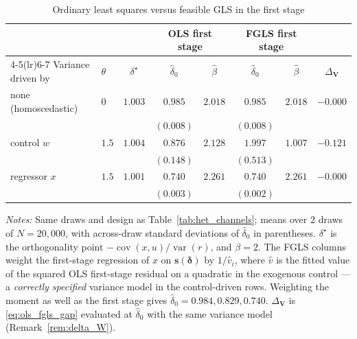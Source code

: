 \begin{table}[!h]
\centering
\caption{Ordinary least squares versus feasible GLS in the first stage}
\label{tab:fgls}
\begin{threeparttable}
\begin{tabular}{llcccccc}
\toprule
& & & \multicolumn{2}{c}{OLS first stage}
& \multicolumn{2}{c}{FGLS first stage} & \\
\cmidrule(lr){4-5}\cmidrule(lr){6-7}
Variance driven by & \(\theta\) & \(\delta^\star\)
& \(\widehat\delta_0\) & \(\widehat\beta\)
& \(\widehat\delta_0\) & \(\widehat\beta\)
& \(\Delta_{\mathbf V}\) \\
\midrule
none (homoscedastic) & \(0\) & \(1.003\) & \(0.985\) & \(2.018\) & \(0.985\) & \(2.018\) & \(-0.000\) \\
 & & & \((0.008)\) & & \((0.008)\) & & \\
\midrule
control \(w\) & \(1.5\) & \(1.004\) & \(0.876\) & \(2.128\) & \(1.997\) & \(1.007\) & \(-0.121\) \\
 & & & \((0.148)\) & & \((0.513)\) & & \\
\midrule
regressor \(x\) & \(1.5\) & \(1.001\) & \(0.740\) & \(2.261\) & \(0.740\) & \(2.261\) & \(-0.000\) \\
 & & & \((0.003)\) & & \((0.002)\) & & \\
\bottomrule
\end{tabular}
\begin{tablenotes}
\small
\item \textit{Notes:} Same draws and design as Table~\ref{tab:het_channels};
means over \(2\) draws of \(N=20{,}000\), with across-draw standard deviations of
\(\widehat\delta_0\) in parentheses. \(\delta^\star\) is the orthogonality point
\(-\operatorname{cov}(x,u)/\operatorname{var}(r)\), and \(\beta=2\). The FGLS
columns weight the first-stage regression of \(x\) on \(\mathbf s(\boldsymbol\delta)\)
by \(1/\widehat v_i\), where \(\widehat v\) is the fitted value of the squared OLS
first-stage residual on a quadratic in the exogenous control --- a
\emph{correctly specified} variance model in the control-driven rows. Weighting
the moment as well as the first stage gives \(\widehat\delta_0=0.984, 0.829, 0.740\).
\(\Delta_{\mathbf V}\) is \eqref{eq:ols_fgls_gap} evaluated at
\(\widehat\delta_0\) with the same variance model (Remark~\ref{rem:delta_W}).
\end{tablenotes}
\end{threeparttable}
\end{table}
